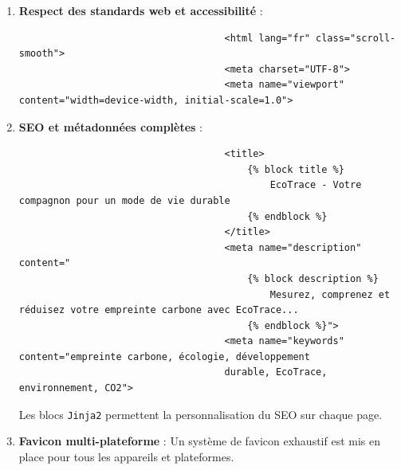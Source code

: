 \documentclass[a4paper,11pt]{article}
\begin{document}
                    \begin{enumerate}
                        \item \textbf{Respect des standards web et accessibilité} :
                            \begin{tcolorbox}[colback=lightgray!6, colframe=black, left=-55mm, right=5mm, top=2mm, bottom=0mm, boxrule=0.1mm]
                                \begin{verbatim}
                                    <html lang="fr" class="scroll-smooth">
                                    <meta charset="UTF-8">
                                    <meta name="viewport" content="width=device-width, initial-scale=1.0">
                                \end{verbatim}
                            \end{tcolorbox}

                        \item \textbf{SEO et métadonnées complètes} :
                            \begin{tcolorbox}[colback=lightgray!6, colframe=black, left=-65mm, right=5mm, top=2mm, bottom=0mm, boxrule=0.1mm]
                                \begin{verbatim}
                                    <title>
                                        {% block title %}
                                            EcoTrace - Votre compagnon pour un mode de vie durable
                                        {% endblock %}
                                    </title>
                                    <meta name="description" content="
                                        {% block description %}
                                            Mesurez, comprenez et réduisez votre empreinte carbone avec EcoTrace...
                                        {% endblock %}">
                                    <meta name="keywords" content="empreinte carbone, écologie, développement 
                                    durable, EcoTrace, environnement, CO2">
                                \end{verbatim}
                            \end{tcolorbox}

                            \noindent Les blocs \texttt{Jinja2} permettent la personnalisation du SEO sur chaque page.

                        \item \textbf{Favicon multi-plateforme} : Un système de favicon exhaustif est mis en place pour tous les appareils et plateformes.


\end{enumerate}
\end{document}
